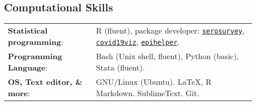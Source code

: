 \documentclass[margin,line]{res}
\begin{document}
\begin{resume}
\section{\sc Computational Skills}
\begin{tabular}{ l l}
	{\bf Statistical programming}: & R (fluent), package developer: %
	\href{https://avallecam.github.io/serosurvey/}{\texttt{serosurvey}}, 
	\href{https://avallecam.github.io/covid19viz/}{\texttt{covid19viz}},
	\href{https://avallecam.github.io/epihelper/}{\texttt{epihelper}}.
	\\ 
	{\bf Programming Language}: & Bash (Unix shell, fluent), Python (basic), Stata (fluent).\\ %
	{\bf OS, Text editor, \& more}: & GNU/Linux (Ubuntu). \LaTeX, R Markdown. SublimeText. Git.\\ %
\end{tabular}


\end{resume}
\end{document}
